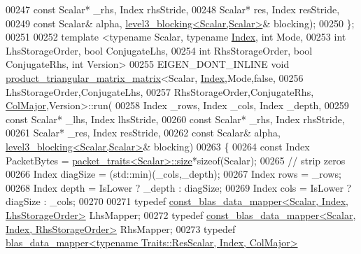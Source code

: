 \begin{DoxyCode}
00247     \textcolor{keyword}{const} Scalar* \_rhs, Index rhsStride,
00248     Scalar* res,        Index resStride,
00249     \textcolor{keyword}{const} Scalar& alpha, \hyperlink{class_eigen_1_1internal_1_1level3__blocking}{level3\_blocking<Scalar,Scalar>}& blocking);
00250 \};
00251 
00252 \textcolor{keyword}{template} <\textcolor{keyword}{typename} Scalar, \textcolor{keyword}{typename} \hyperlink{namespace_eigen_a62e77e0933482dafde8fe197d9a2cfde}{Index}, \textcolor{keywordtype}{int} Mode,
00253           \textcolor{keywordtype}{int} LhsStorageOrder, \textcolor{keywordtype}{bool} ConjugateLhs,
00254           \textcolor{keywordtype}{int} RhsStorageOrder, \textcolor{keywordtype}{bool} ConjugateRhs, \textcolor{keywordtype}{int} Version>
00255 EIGEN\_DONT\_INLINE \textcolor{keywordtype}{void} \hyperlink{struct_eigen_1_1internal_1_1product__triangular__matrix__matrix}{product\_triangular\_matrix\_matrix}<Scalar,
      \hyperlink{namespace_eigen_a62e77e0933482dafde8fe197d9a2cfde}{Index},Mode,\textcolor{keyword}{false},
00256                                                         LhsStorageOrder,ConjugateLhs,
00257                                                         RhsStorageOrder,ConjugateRhs,
      \hyperlink{group__enums_ggaacded1a18ae58b0f554751f6cdf9eb13a0cbd4bdd0abcfc0224c5fcb5e4f6669a}{ColMajor},Version>::run(
00258     Index \_rows, Index \_cols, Index \_depth,
00259     \textcolor{keyword}{const} Scalar* \_lhs, Index lhsStride,
00260     \textcolor{keyword}{const} Scalar* \_rhs, Index rhsStride,
00261     Scalar* \_res,        Index resStride,
00262     \textcolor{keyword}{const} Scalar& alpha, \hyperlink{class_eigen_1_1internal_1_1level3__blocking}{level3\_blocking<Scalar,Scalar>}& blocking)
00263   \{
00264     \textcolor{keyword}{const} Index PacketBytes = \hyperlink{struct_eigen_1_1internal_1_1packet__traits}{packet\_traits<Scalar>::size}*\textcolor{keyword}{sizeof}(Scalar);
00265     \textcolor{comment}{// strip zeros}
00266     Index diagSize  = (std::min)(\_cols,\_depth);
00267     Index rows      = \_rows;
00268     Index depth     = IsLower ? \_depth : diagSize;
00269     Index cols      = IsLower ? diagSize : \_cols;
00270     
00271     \textcolor{keyword}{typedef} \hyperlink{class_eigen_1_1internal_1_1const__blas__data__mapper}{const\_blas\_data\_mapper<Scalar, Index, LhsStorageOrder>}
       LhsMapper;
00272     \textcolor{keyword}{typedef} \hyperlink{class_eigen_1_1internal_1_1const__blas__data__mapper}{const\_blas\_data\_mapper<Scalar, Index, RhsStorageOrder>}
       RhsMapper;
00273     \textcolor{keyword}{typedef} \hyperlink{class_eigen_1_1internal_1_1blas__data__mapper}{blas\_data\_mapper<typename Traits::ResScalar, Index, ColMajor>}

\end{DoxyCode}
